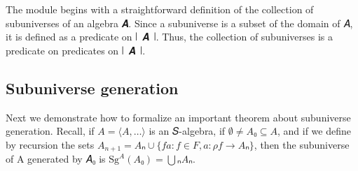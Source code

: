 \documentclass[a4paper,UKenglish,cleveref, autoref, thm-restate]{lipics-v2019}
\begin{document}

The module begins with a straightforward definition of the collection of subuniverses of an algebra 𝑨. Since a subuniverse is a subset of the domain of 𝐴, it is defined as a predicate on ∣~𝑨~∣. Thus, the collection of subuniverses is a predicate on predicates on ∣~𝑨~∣.
\begin{code}\end{code}

\begin{comment}
Before describing subuniverse generation, we will need to dispense with some more technicalities.
\begin{code}\end{code}
\end{comment}


\subsection{Subuniverse generation}\label{subuniverse-generation}
Next we demonstrate how to formalize an important theorem about subuniverse generation. Recall, if \(A = ⟨𝐴, …⟩\) is an 𝑆-algebra, if \(∅ ≠ 𝐴₀ ⊆ 𝐴\), and if we define by recursion the sets \(A_{n+1} = Aₙ ∪ \{ f a : f ∈ F, a : ρ f → Aₙ \}\), then the subuniverse of A generated by 𝐴₀ is \(\mathrm{Sg}^A(A₀) = ⋃ₙ Aₙ\).
\begin{code}\end{code}
\end{document}
